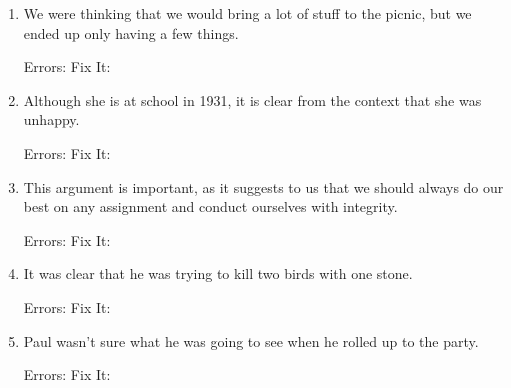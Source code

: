 \begin{enumerate}
\item We were thinking that we would bring a lot of stuff to the picnic, but we ended up only
having a few things.

Errors: \hrulefill
Fix It: \hrulefill
\noindent\makebox[\linewidth]{\rule{\paperwidth}{0.4pt}}

\item Although she is at school in 1931, it is clear from the context that she was unhappy.

Errors: \hrulefill
Fix It: \hrulefill
\noindent\makebox[\linewidth]{\rule{\paperwidth}{0.4pt}}

\item This argument is important, as it suggests to us that we should always do our best on any
assignment and conduct ourselves with integrity.

Errors: \hrulefill
Fix It: \hrulefill
\noindent\makebox[\linewidth]{\rule{\paperwidth}{0.4pt}}

\item It was clear that he was trying to kill two birds with one stone.

Errors: \hrulefill
Fix It: \hrulefill
\noindent\makebox[\linewidth]{\rule{\paperwidth}{0.4pt}}

\item Paul wasn't sure what he was going to see when he rolled up to the party.

Errors: \hrulefill
Fix It: \hrulefill
\noindent\makebox[\linewidth]{\rule{\paperwidth}{0.4pt}}

\end{enumerate} 
